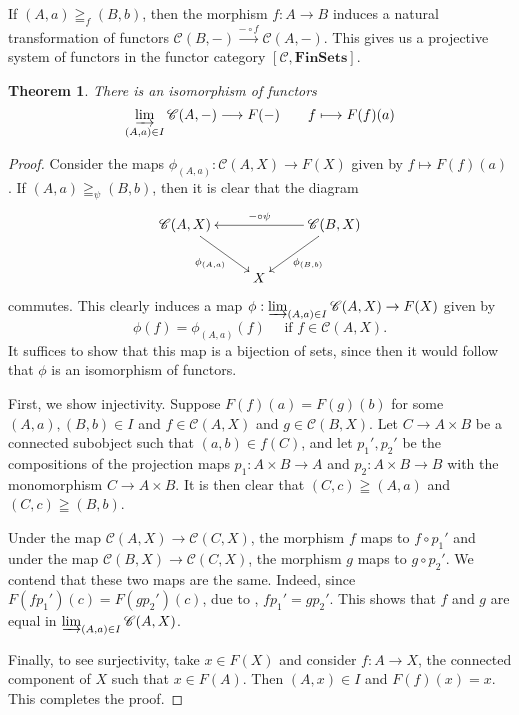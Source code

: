 \documentclass[10pt]{article}
\theoremstyle{thmstyle}
\newtheorem{theorem}{Theorem}[section]
\theoremstyle{defstyle}
\newcommand{\catFinSets}{\mathbf{FinSets}}
\newcommand{\scrC}{\mathscr{C}} %
\begin{document}
If $(A, a)\geqq_f (B, b)$, then the morphism $f: A\to B$ induces a natural transformation of functors $\scrC(B, -)\xrightarrow{-\circ f}\scrC(A, -)$. This gives us a projective system of functors in the functor category $[\scrC,\catFinSets]$. 

\begin{theorem}
    There is an isomorphism of functors 
    \begin{equation*}
        \varinjlim_{(A, a)\in I}\scrC(A, -)\longrightarrow F(-)\qquad f\longmapsto F(f)(a)
    \end{equation*}
\end{theorem}
\begin{proof} 
    Consider the maps $\phi_{(A, a)}: \scrC(A, X)\to F(X)$ given by $f\mapsto F(f)(a)$. If $(A, a)\geqq_\psi (B, b)$, then it is clear that the diagram 
    \begin{equation*}
        \xymatrix {
            \scrC(A, X)\ar[rd]_-{\phi_{(A, a)}} & & \scrC(B, X)\ar[ld]^-{\phi_{(B, b)}}\ar[ll]_{-\circ\psi}\\
            & X &
        }
    \end{equation*}
    commutes. This clearly induces a map $\phi: \varinjlim_{(A, a)\in I}\scrC(A, X)\to F(X)$ given by 
    \begin{equation*}
        \phi(f) = \phi_{(A, a)}(f) \quad\text{ if } f\in\scrC(A, X).
    \end{equation*}
    It suffices to show that this map is a bijection of sets, since then it would follow that $\phi$ is an isomorphism of functors.

    First, we show injectivity. Suppose $F(f)(a) = F(g)(b)$ for some $(A, a), (B, b)\in I$ and $f\in\scrC(A, X)$ and $g\in\scrC(B, X)$. Let $C\to A\times B$ be a connected subobject such that $(a, b)\in f(C)$, and let $p_1', p_2'$ be the compositions of the projection maps $p_1: A\times B\to A$ and $p_2: A\times B\to B$ with the monomorphism $C\to A\times B$. It is then clear that $\left(C, c\right)\geqq(A, a)$ and $\left(C, c\right)\geqq(B, b)$. 

    Under the map $\scrC(A, X)\to\scrC(C, X)$, the morphism $f$ maps to $f\circ p_1'$ and under the map $\scrC(B, X)\to\scrC(C, X)$, the morphism $g$ maps to $g\circ p_2'$. We contend that these two maps are the same. Indeed, since $F(fp_1')(c) = F(gp_2')(c)$, due to , $fp_1' = gp_2'$. This shows that $f$ and $g$ are equal in $\varinjlim_{(A, a)\in I}\scrC(A, X)$.

    Finally, to see surjectivity, take $x\in F(X)$ and consider $f: A\to X$, the connected component of $X$ such that $x\in F(A)$. Then $(A, x)\in I$ and $F(f)(x) = x$. This completes the proof.
\end{proof}
\end{document}
